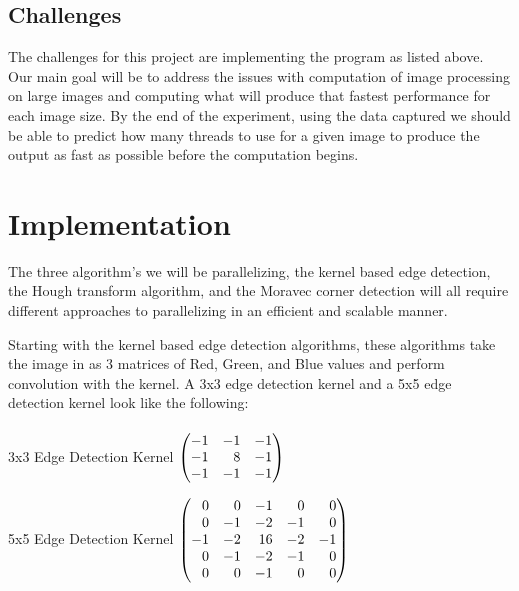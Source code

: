 \documentclass{article}
\begin{document}
\begin{multicols}{2}
            \subsection{Challenges}
                The challenges for this project are implementing the program as listed above.  Our main goal will be to address the issues with computation of image processing on large images and computing what will produce that fastest performance for each image size. By the end of the experiment, using the data captured we should be able to predict how many threads to use for a given image to produce the output as fast as possible before the computation begins.
                
            \end{multicols}
            
    
    \section{Implementation}
        The three algorithm's we will be parallelizing, the kernel based edge detection, the Hough transform algorithm, and the Moravec corner detection will all require different approaches to parallelizing in an efficient and scalable manner.
        
        Starting with the kernel based edge detection algorithms, these algorithms take the image in as 3 matrices of Red, Green, and Blue values and perform convolution with the kernel.  A 3x3 edge detection kernel and a 5x5 edge detection kernel look like the following:\\\\
        
        3x3 Edge Detection Kernel
        $\begin{pmatrix*}[r]
        -1 & -1 & -1\\
        -1 &  8 & -1\\
        -1 & -1 & -1
        \end{pmatrix*}\\\\$
        
        5x5 Edge Detection Kernel
        $\begin{pmatrix*}[r]
        0 &   0 & -1 &  0 &  0\\
        0 &  -1 & -2 & -1 &  0\\
        -1 & -2 & 16 & -2 & -1\\
        0 &  -1 & -2 & -1 &  0\\
        0 &   0 & -1 &  0 &  0
        \end{pmatrix*}\\\\$
        
\end{document}
